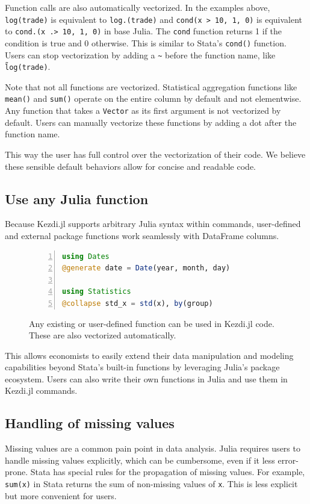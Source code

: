 \documentclass{juliacon}
\begin{document}
Function calls are also automatically vectorized. In the examples above, \texttt{log(trade)} is equivalent to \texttt{log.(trade)} and \texttt{cond(x > 10, 1, 0)} is equivalent to \texttt{cond.(x .> 10, 1, 0)} in base Julia. The \texttt{cond} function returns 1 if the condition is true and 0 otherwise. This is similar to Stata's \texttt{cond()} function. Users can stop vectorization by adding a \texttt{\~} before the function name, like \texttt{\~log(trade)}.

Note that not all functions are vectorized. Statistical aggregation functions like \texttt{mean()} and \texttt{sum()} operate on the entire column by default and not elementwise. Any function that takes a \texttt{Vector} as its first argument is not vectorized by default. Users can manually vectorize these functions by adding a dot after the function name.

This way the user has full control over the vectorization of their code. We believe these sensible default behaviors allow for concise and readable code.

\subsection{Use any Julia function}

Because Kezdi.jl supports arbitrary Julia syntax within commands, user-defined and external package functions work seamlessly with DataFrame columns.

\begin{figure}[h!]
\begin{lstlisting}[language = Julia, numbers=left, numberstyle=\tiny\color{gray}]
using Dates
@generate date = Date(year, month, day)

using Statistics
@collapse std_x = std(x), by(group) 
\end{lstlisting}
	
\caption{Any existing or user-defined function can be used in Kezdi.jl code. These are also vectorized automatically.}
\label{fig:vectorization}
\end{figure}

This allows economists to easily extend their data manipulation and modeling capabilities beyond Stata's built-in functions by leveraging Julia's package ecosystem. Users can also write their own functions in Julia and use them in Kezdi.jl commands. 

\subsection{Handling of missing values}
Missing values are a common pain point in data analysis. Julia requires users to handle missing values explicitly, which can be cumbersome, even if it less error-prone. Stata has special rules for the propagation of missing values. For example, \texttt{sum(x)} in Stata returns the sum of non-missing values of \texttt{x}. This is less explicit but more convenient for users.
\end{document}
